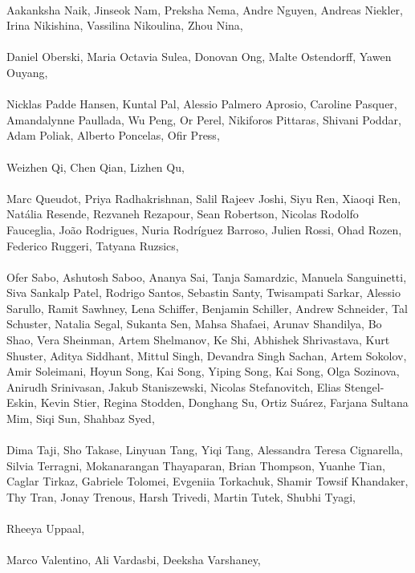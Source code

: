 \documentclass[11pt]{article}
\begin{document}
\begin{description}[itemsep=4mm, style=nextline]
\\
Aakanksha Naik, 
Jinseok Nam, 
Preksha Nema, 
Andre Nguyen, 
Andreas Niekler, 
Irina Nikishina, 
Vassilina Nikoulina, 
Zhou Nina, 
\\
\\
Daniel Oberski, 
Maria Octavia Sulea, 
Donovan Ong, 
Malte Ostendorff, 
Yawen Ouyang, 
\\
\\
Nicklas Padde Hansen, 
Kuntal Pal, 
Alessio Palmero Aprosio, 
Caroline Pasquer, 
Amandalynne Paullada, 
Wu Peng, 
Or Perel, 
Nikiforos Pittaras, 
Shivani Poddar, 
Adam Poliak, 
Alberto Poncelas, 
Ofir Press, 
\\
\\
Weizhen Qi, 
Chen Qian, 
Lizhen Qu,
\\
\\
Marc Queudot, 
Priya Radhakrishnan, 
Salil Rajeev Joshi, 
Siyu Ren, 
Xiaoqi Ren, 
Natália Resende, 
Rezvaneh Rezapour, 
Sean Robertson, 
Nicolas Rodolfo Fauceglia, 
João Rodrigues, 
Nuria Rodríguez Barroso, 
Julien Rossi, 
Ohad Rozen, 
Federico Ruggeri, 
Tatyana Ruzsics, 
\\
\\
Ofer Sabo, 
Ashutosh Saboo, 
Ananya Sai, 
Tanja Samardzic, 
Manuela Sanguinetti, 
Siva Sankalp Patel, 
Rodrigo Santos, 
Sebastin Santy, 
Twisampati Sarkar, 
Alessio Sarullo, 
Ramit Sawhney, 
Lena Schiffer, 
Benjamin Schiller, 
Andrew Schneider, 
Tal Schuster, 
Natalia Segal, 
Sukanta Sen, 
Mahsa Shafaei, 
Arunav Shandilya, 
Bo Shao, 
Vera Sheinman, 
Artem Shelmanov, 
Ke Shi, 
Abhishek Shrivastava, 
Kurt Shuster, 
Aditya Siddhant, 
Mittul Singh, 
Devandra Singh Sachan, 
Artem Sokolov, 
Amir Soleimani, 
Hoyun Song, 
Kai Song, 
Yiping Song, 
Kai Song, 
Olga Sozinova, 
Anirudh Srinivasan, 
Jakub Staniszewski, 
Nicolas Stefanovitch, 
Elias Stengel-Eskin, 
Kevin Stier, 
Regina Stodden, 
Donghang Su, 
Ortiz Suárez, 
Farjana Sultana Mim, 
Siqi Sun, 
Shahbaz Syed, 
\\
\\
Dima Taji, 
Sho Takase, 
Linyuan Tang, 
Yiqi Tang, 
Alessandra Teresa Cignarella, 
Silvia Terragni, 
Mokanarangan Thayaparan, 
Brian Thompson, 
Yuanhe Tian, 
Caglar Tirkaz, 
Gabriele Tolomei, 
Evgeniia Torkachuk, 
Shamir Towsif Khandaker, 
Thy Tran, 
Jonay Trenous, 
Harsh Trivedi, 
Martin Tutek, 
Shubhi Tyagi, 
\\
\\
Rheeya Uppaal, 
\\
\\
Marco Valentino, 
Ali Vardasbi, 
Deeksha Varshaney, 

\end{description}
\end{document}
